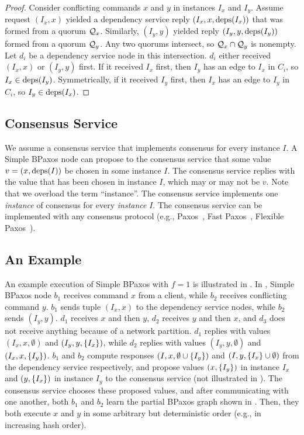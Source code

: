 \begin{proof}
  Consider conflicting commands $x$ and $y$ in instances $I_x$ and $I_y$.
  Assume request $(I_x, x)$ yielded a dependency service reply $(I_x, x,
  \text{deps}(I_x))$ that was formed from a quorum $\mathcal{Q}_x$. Similarly, $(I_y, y)$
  yielded reply $(I_y, y, \text{deps}(I_y))$ formed from a quorum $\mathcal{Q}_y$. Any two
  quorums intersect, so $\mathcal{Q}_x \cap \mathcal{Q}_y$ is nonempty. Let $d_i$ be a
  dependency service node in this intersection. $d_i$ either received $(I_x,
  x)$ or $(I_y, y)$ first. If it received $I_x$ first, then $I_y$ has an edge
  to $I_x$ in $C_i$, so $I_x \in \text{deps}(I_y)$.  Symmetrically, if it received
  $I_y$ first, then $I_x$ has an edge to $I_y$ in $C_i$, so $I_y \in
  \text{deps}(I_x)$.
\end{proof}

\subsection{Consensus Service}
We assume a consensus service that implements consensus for every instance $I$.
A Simple BPaxos node can propose to the consensus service that some value $v =
(x, \text{deps}(I))$ be chosen in some instance $I$. The consensus service replies
with the value that has been chosen in instance $I$, which may or may not be
$v$. Note that we overload the term ``instance''. The consensus service
implements one \emph{instance} of consensus for every \emph{instance} $I$. The
consensus service can be implemented with any consensus protocol (e.g.,
Paxos~\cite{lamport1998part, lamport2001paxos}, Fast
Paxos~\cite{lamport2006fast}, Flexible Paxos~\cite{howard2016flexible}).

\subsection{An Example}


An example execution of Simple BPaxos with $f=1$ is illustrated in
. In , Simple BPaxos
node $b_1$ receives command $x$ from a client, while $b_2$ receives conflicting
command $y$. $b_1$ sends tuple $(I_x, x)$ to the dependency service nodes,
while $b_2$ sends $(I_y, y)$. $d_1$ receives $x$ and then $y$, $d_2$ receives
$y$ and then $x$, and $d_3$ does not receive anything because of a network
partition. $d_1$ replies with values $(I_x, x, \emptyset)$ and $(I_y, y,
\{I_x\})$, while $d_2$ replies with values $(I_y, y, \emptyset)$ and $(I_x,
x, \{I_y\})$.  $b_1$ and $b_2$ compute responses $(I, x, \emptyset{} \cup
\{I_y\})$ and $(I, y, \{I_x\} \cup \emptyset{})$ from the dependency
service respectively, and propose values $(x, \{I_y\})$ in instance $I_x$ and
$(y, \{I_x\})$ in instance $I_y$ to the consensus service (not illustrated in
). The consensus service chooses these proposed
values, and after communicating with one another, both $b_1$ and $b_2$ learn
the partial BPaxos graph shown in . Then, they
both execute $x$ and $y$ in some arbitrary but deterministic order (e.g., in
increasing hash order).

